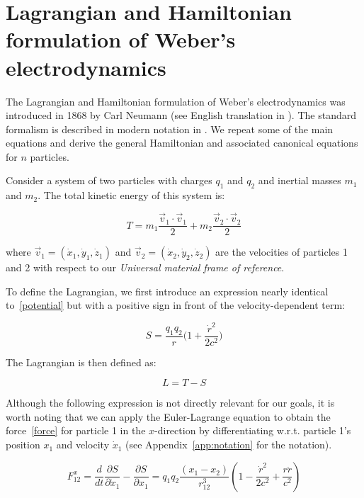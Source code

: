 \documentclass[12pt,a4paper]{article}
\theoremstyle{definition}
\theoremstyle{remark}
\newcommand{\qq}{q_1 q_2}
\newcommand{\rdot}{\dot{r}}
\begin{document}
\section{Lagrangian and Hamiltonian formulation of Weber's electrodynamics}\label{LH}
The Lagrangian and Hamiltonian formulation of Weber's electrodynamics was introduced in 1868 by Carl Neumann (see English translation in \citep{assis-weber-vol4}). The standard formalism is described in modern notation in \citep{assis-weber}. We repeat some of the main equations and derive the general Hamiltonian and associated canonical equations for $n$ particles.

Consider a system of two particles with charges $q_1$ and $q_2$ and inertial masses $m_1$ and $m_2$. The total kinetic energy of this system is:

\begin{equation}\label{ke}
    T = m_1 \frac{\vec{v}_1 \cdot \vec{v}_1}{2} + m_2 \frac{\vec{v}_2 \cdot \vec{v}_2}{2}
\end{equation}

where $\vec{v}_1 = (\dot{x}_1, \dot{y}_1, \dot{z}_1)$ and $\vec{v}_2 = (\dot{x}_2, \dot{y}_2, \dot{z}_2)$ are the velocities of particles 1 and 2 with respect to our \textit{Universal material frame of reference}.

To define the Lagrangian, we first introduce an expression nearly identical to~\eqref{potential} but with a positive sign in front of the velocity-dependent term:

\begin{equation}
    S = \frac{\qq}{r}\bigg(1 + \frac{\rdot^2}{2c^2}\bigg)
\end{equation}

The Lagrangian is then defined as:

\begin{equation}
    \boxed{L = T - S}
\end{equation}

Although the following expression is not directly relevant for our goals, it is worth noting that we can apply the Euler-Lagrange equation to obtain the force~\eqref{force} for particle 1 in the $x$-direction by differentiating w.r.t. particle 1's position $x_1$ and velocity $\dot{x}_1$ (see Appendix~\ref{app:notation} for the notation).

\begin{equation}\label{euler_lagrange}
    F_{12}^x = \frac{d}{dt}\frac{\partial S}{\partial \dot{x}_1} - \frac{\partial S}{\partial x_1} = \qq \frac{(x_1 - x_2)}{r_{12}^3} \left(1 - \frac{\dot{r}^2}{2c^2} + \frac{r\ddot{r}}{c^2}\right)
\end{equation}
\end{document}
